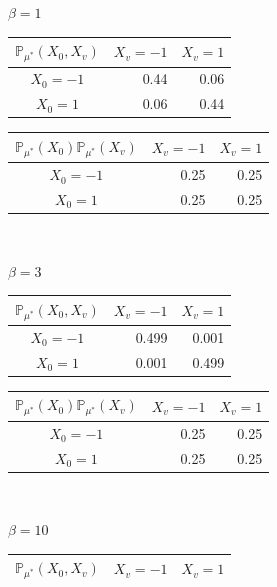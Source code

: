 \documentclass[12pt]{article}
\numberwithin{equation}{section}
\begin{document}
\begin{table}[h]
    \raggedright
    $\beta=1$\\
    \centering
    \begin{tabular}{c|rr}
        $\mathbb{P}_{\mu^*}(X_0, X_v)$ & \multicolumn{1}{c}{$X_v=-1$} & \multicolumn{1}{c}{$X_v=1$} \\ \hline
        $X_0=-1$                       & 0.44                         & 0.06                        \\
        $X_0=1$                        & 0.06                         & 0.44
    \end{tabular}
    \quad\quad
    \begin{tabular}{c|rr}
        $\mathbb{P}_{\mu^*}(X_0)\mathbb{P}_{\mu^*}(X_v)$ & \multicolumn{1}{c}{$X_v=-1$} & \multicolumn{1}{c}{$X_v=1$} \\ \hline
        $X_0=-1$                                         & 0.25                         & 0.25                        \\
        $X_0=1$                                          & 0.25                         & 0.25
    \end{tabular} \\
    \raggedright
    $\beta=3$\\
    \centering
    \begin{tabular}{c|rr}
        $\mathbb{P}_{\mu^*}(X_0, X_v)$ & \multicolumn{1}{c}{$X_v=-1$} & \multicolumn{1}{c}{$X_v=1$} \\ \hline
        $X_0=-1$                       & 0.499                        & 0.001                       \\
        $X_0=1$                        & 0.001                        & 0.499
    \end{tabular}
    \quad\quad
    \begin{tabular}{c|rr}
        $\mathbb{P}_{\mu^*}(X_0)\mathbb{P}_{\mu^*}(X_v)$ & \multicolumn{1}{c}{$X_v=-1$} & \multicolumn{1}{c}{$X_v=1$} \\ \hline
        $X_0=-1$                                         & 0.25                         & 0.25                        \\
        $X_0=1$                                          & 0.25                         & 0.25
    \end{tabular} \\
    \raggedright
    $\beta=10$\\
    \centering
    \begin{tabular}{c|rr}
        $\mathbb{P}_{\mu^*}(X_0, X_v)$ & \multicolumn{1}{c}{$X_v=-1$} & \multicolumn{1}{c}{$X_v=1$} \\ \hline

\end{tabular}
\end{table}
\end{document}
